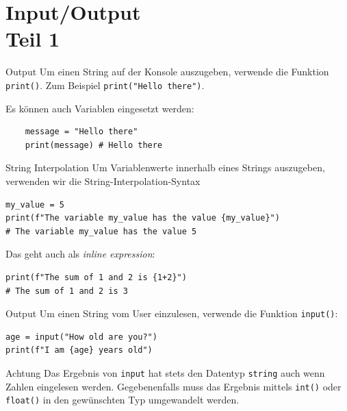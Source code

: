 \documentclass[algorithm,pgfplots,colortheme=dark]{cuzbeamer}
\newcommand{\py}[1]{\texttt{#1}}
\begin{document}
\section{Input/Output \\ \footnotesize Teil 1}

\begin{fragile}[]

\begin{block}{Output}
	\vspace{2pt}
	Um einen String auf der Konsole auszugeben, verwende die Funktion \py{print()}. 
	Zum Beispiel \py{print("Hello there")}. 
	
	Es können auch Variablen eingesetzt werden: 
	\begin{verbatim}
	message = "Hello there"
	print(message) # Hello there
	\end{verbatim}
	
	\end{block}
	
\end{fragile}

\begin{fragile}[]
	
\begin{block}{String Interpolation}
\vspace{2pt}
Um Variablenwerte innerhalb eines Strings auszugeben, verwenden wir die String-Interpolation-Syntax
\begin{verbatim}
my_value = 5
print(f"The variable my_value has the value {my_value}")
# The variable my_value has the value 5
\end{verbatim}

Das geht auch als \textit{inline expression}: 
\begin{verbatim}
print(f"The sum of 1 and 2 is {1+2}")
# The sum of 1 and 2 is 3
\end{verbatim}

\end{block}
	
\end{fragile}

\begin{fragile}
\begin{block}{Output}
	\vspace{2pt}
Um einen String vom User einzulesen, verwende die Funktion \py{input()}:
\begin{verbatim}
age = input("How old are you?")
print(f"I am {age} years old")
\end{verbatim}
\end{block}

\begin{alertblock}{Achtung}
	\vspace{2pt}
Das Ergebnis von \py{input} hat stets den Datentyp \py{string} auch wenn Zahlen eingelesen werden. Gegebenenfalls muss das Ergebnis mittels \py{int()} oder \py{float()} in den gewünschten Typ umgewandelt werden. 	
\end{alertblock}

\end{fragile}
\end{document}
